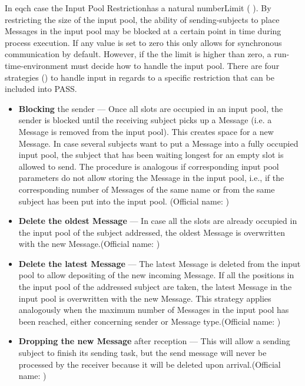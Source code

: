 In eqch case the Input Pool Restrictionhas a natural numberLimit ( ). By restricting the size of the input pool, the ability of sending-subjects to place Messages in the input pool may be blocked at a certain point in time during process execution. If any value is set to zero this only allows for synchronous communication by default. However, if the the limit is higher than zero, a run-time-environment must decide how to handle the input pool. There are four strategies () to handle input in regards to a specific restriction that can be included into PASS.

\begin{itemize}
	\item \textbf{Blocking} the sender --- Once all slots are occupied in an input pool, the sender is blocked until the receiving subject picks up a Message (i.e. a Message is removed from the input pool). This creates space for a new Message. In case several subjects want to put a Message into a fully occupied input pool, the subject that has been waiting longest for an empty slot is allowed to send. The procedure is analogous if corresponding input pool parameters do not allow storing the Message in the input pool, i.e., if the corresponding number of Messages of the same name or from the same subject has been put into the input pool. \newline (Official name: )
	\item \textbf{Delete the oldest Message} --- In case all the slots are already occupied in the input pool of the subject addressed, the oldest Message is overwritten with the new Message.(Official name: )
	\item \textbf{Delete the latest Message} --- The latest Message is deleted from the input pool to allow depositing of the new incoming Message. If all the positions in the input pool of the addressed subject are taken, the latest Message in the input pool is overwritten with the new Message. This strategy applies analogously when the maximum number of Messages in the input pool has been reached, either concerning sender or Message type.(Official name: )
	\item \textbf{Dropping the new Message} after reception --- This will allow a sending subject to finish its sending task, but the send message will never be processed by the receiver because it will be deleted upon arrival.(Official name: )
\end{itemize}